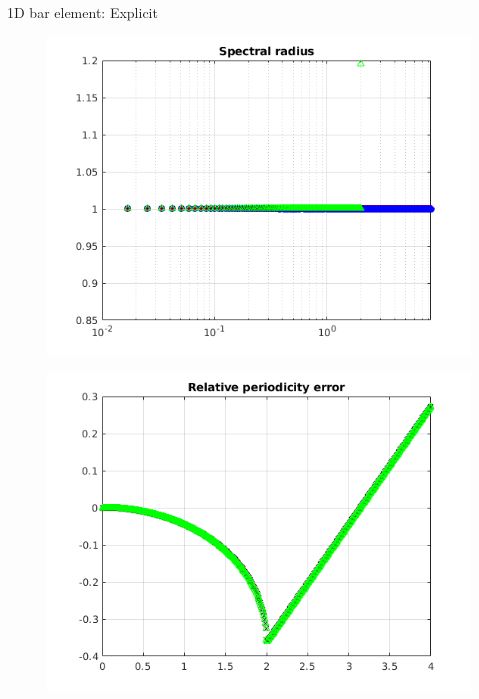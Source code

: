 \begin{frame}{1D bar element: Explicit}
\begin{figure}[ht]
\begin{minipage}[b]{0.5\linewidth}
  \end{minipage}%
  \begin{minipage}[b]{0.5\linewidth}
    \centering
    \includegraphics[scale=.35]{images/bar-exp-2.png} \\
  \end{minipage} 
  \begin{minipage}[b]{0.5\linewidth}
    \centering
    \includegraphics[scale=.35]{images/bar-exp-3.png} \\


\end{minipage}
\end{figure}
\end{frame}

